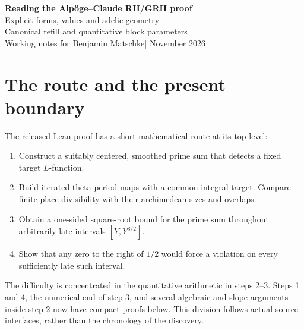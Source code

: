 \documentclass[11pt,a4paper]{article}
\numberwithin{equation}{section}
\theoremstyle{remark}\newtheorem{remark}[theorem]{Remark}
\begin{document}
\begin{center}
{\LARGE\bfseries Reading the Alp\"oge--Claude RH/GRH proof}\\[7pt]
{\large Explicit forms, values and adelic geometry}\\[-1pt]
{\large Canonical refill and quantitative block parameters}\\[8pt]
Working notes for Benjamin Matschke\quad | November 2026
\end{center}

\begingroup\setlength{\fboxsep}{9pt}
\noindent{}\endgroup

\section{The route and the present boundary}

The released Lean proof has a short mathematical route at its top level:
\begin{enumerate}
\item Construct a suitably centered, smoothed prime sum that detects a fixed target $L$-function.
\item Build iterated theta-period maps with a common integral target. Compare finite-place divisibility with their archimedean sizes and overlaps.
\item Obtain a one-sided square-root bound for the prime sum throughout arbitrarily late intervals $[Y,Y^{3/2}]$.
\item Show that any zero to the right of $1/2$ would force a violation on every sufficiently late such interval.
\end{enumerate}
The difficulty is concentrated in the quantitative arithmetic in steps 2--3. Steps 1 and 4, the numerical end of step 3, and several algebraic and slope arguments inside step 2 now have compact proofs below. This division follows actual source interfaces, rather than the chronology of the discovery.
\end{document}
